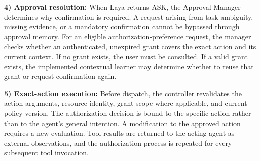 \documentclass[10pt,conference]{IEEEtran}
\newcommand{\Ask}{\ensuremath{\mathrm{ASK}}}
\begin{document}
\textbf{4) Approval resolution:}
When Laya returns \Ask, the Approval Manager determines why confirmation is required. A request arising from task ambiguity, missing evidence, or a mandatory confirmation cannot be bypassed through approval memory. For an eligible authorization-preference request, the manager checks whether an authenticated, unexpired grant covers the exact action and its current context. If no grant exists, the user must be consulted. If a valid grant exists, the implemented contextual learner may determine whether to reuse that grant or request confirmation again.

\textbf{5) Exact-action execution:}
Before dispatch, the controller revalidates the action arguments, resource identity, grant scope where applicable, and current policy version. The authorization decision is bound to the specific action rather than to the agent's general intention. A modification to the approved action requires a new evaluation. Tool results are returned to the acting agent as external observations, and the authorization process is repeated for every subsequent tool invocation.
\end{document}
